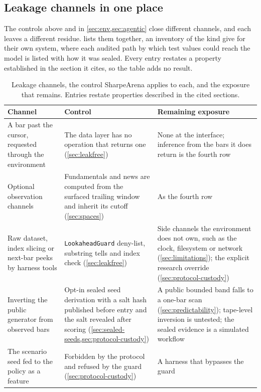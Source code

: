 \subsection{Leakage channels in one place}\label{sec:protocol-leakage}

The controls above and in \cref{sec:env,sec:agentic} close different channels, and each leaves a different residue.  lists them together, an inventory of the kind \citet[Appendix~A.4, p.~30]{li2026agora} give for their own system, where each audited path by which test values could reach the model is listed with how it was sealed. Every entry restates a property established in the section it cites, so the table adds no result.

\begin{table}[t]
\centering
\caption{Leakage channels, the control SharpeArena applies to each, and the exposure that remains. Entries restate properties described in the cited sections.}
\label{tab:leakage}
\scriptsize
\setlength{\tabcolsep}{3.5pt}
\begin{tabular}{@{}p{3.3cm} p{4.6cm} p{5.2cm}@{}}
\toprule
Channel & Control & Remaining exposure \\
\midrule
A bar past the cursor, requested through the environment & The data layer has no operation that returns one (\cref{sec:leakfree}) & None at the interface; inference from the bars it does return is the fourth row \\
\addlinespace
Optional observation channels & Fundamentals and news are computed from the surfaced trailing window and inherit its cutoff (\cref{sec:spaces}) & As the fourth row \\
\addlinespace
Raw dataset, index slicing or next-bar peeks by harness tools & \texttt{LookaheadGuard} deny-list, substring tells and index check (\cref{sec:leakfree}) & Side channels the environment does not own, such as the clock, filesystem or network (\cref{sec:limitations}); the explicit research override (\cref{sec:protocol-custody}) \\
\addlinespace
Inverting the public generator from observed bars & Opt-in sealed seed derivation with a salt hash published before entry and the salt revealed after scoring (\cref{sec:sealed-seeds,sec:protocol-custody}) & A public bounded band falls to a one-bar scan (\cref{sec:predictability}); tape-level inversion is untested; the sealed evidence is a simulated workflow \\
\addlinespace
The scenario seed fed to the policy as a feature & Forbidden by the protocol and refused by the guard (\cref{sec:protocol-custody}) & A harness that bypasses the guard \\

\end{tabular}
\end{table}

